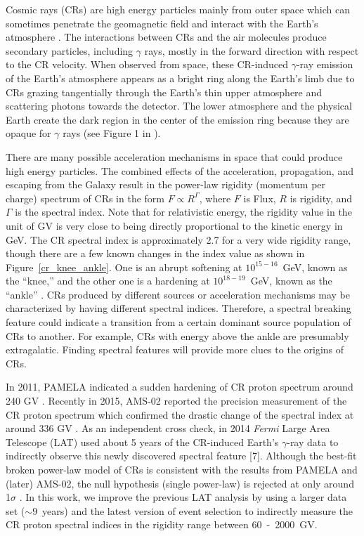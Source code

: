 Cosmic rays (CRs) are high energy particles mainly from outer space which can sometimes
penetrate the geomagnetic field and interact with the Earth's atmosphere \cite{HESS,Pacini,Clay}.
The interactions between CRs and the air molecules produce secondary particles,
including $\gamma$ rays, mostly in the forward direction with respect to the CR velocity.
When observed from space, these CR-induced $\gamma$-ray emission of the Earth's
atmosphere appears as a bright ring along the Earth's limb due to CRs grazing
tangentially through the Earth's thin upper atmosphere and scattering photons
towards the detector. The lower atmosphere and the physical Earth create the dark
region in the center of the emission ring because they are opaque
for $\gamma$ rays (see Figure 1 in \cite{Warit2009}).

There are many possible acceleration mechanisms in
space that could produce high energy particles.
The combined effects of the acceleration, propagation, and escaping from the Galaxy
result in the power-law rigidity (momentum per charge) spectrum of CRs in the
form $F\propto R^\Gamma$, where $F$ is Flux, $R$ is rigidity, and $\Gamma$ is
the spectral index. Note that for relativistic energy, the rigidity value in
the unit of GV is very close to being directly proportional to the kinetic energy
in GeV. The CR spectral index is approximately 2.7 for a very wide rigidity range,
though there are a few known changes in the index value as shown in Figure~\ref{cr_knee_ankle}.
One is an abrupt softening
at $10^{15-16}$~GeV, known as the ``knee,'' \cite{Allan1962,Haungs2003} and the other one is a
hardening at $10^{18-19}$~GeV, known as the ``ankle'' \cite{ABBASI2005271}.
CRs produced by different sources or acceleration mechanisms may be characterized
by having different spectral indices. Therefore, a spectral breaking feature
could indicate a transition from a certain dominant source population of
CRs to another. For example, CRs with energy above the ankle are presumably
extragalatic. Finding spectral features will provide more clues to the origins
of CRs.


In 2011, PAMELA indicated a sudden hardening of CR proton spectrum around 240 GV \cite{PAMELA}.
Recently in 2015, AMS-02 reported the precision measurement of the CR proton spectrum
which confirmed the drastic change of the spectral index at around 336 GV \cite{AMS-02}.
As an independent cross check, in 2014 {\it Fermi} Large Area Telescope (LAT) used
about 5 years of the CR-induced Earth's $\gamma$-ray data to indirectly observe
this newly discovered spectral feature [7]. Although the best-fit broken power-law
model of CRs is consistent with the results from PAMELA and (later) AMS-02, the null
hypothesis (single power-law) is rejected at only around 1$\sigma$ \cite{previouswork}.
In this work, we improve the previous LAT analysis by using a larger data set
($\sim9$~years) and the latest version of event selection to indirectly measure the
CR proton spectral indices in the rigidity range between 60~-~2000~GV.